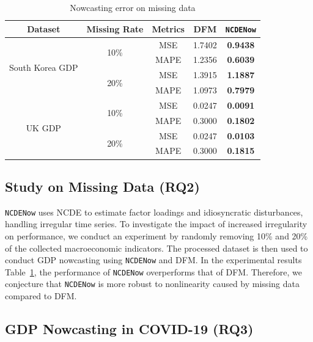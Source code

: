 \documentclass[sigconf]{acmart}
\begin{document}
\begin{table}[t]
\small
\centering
\caption{Nowcasting error on missing data}
\label{tab:exp_missing}
\begin{tabular}{ccccc}\toprule
Dataset & Missing Rate & Metrics & DFM & \texttt{NCDENow} \\\midrule
 \multirow{4}{*}{South Korea GDP}  
  & \multirow{2}{*}{10\%} 
  & MSE & 1.7402 & \textbf{0.9438} \\
 && MAPE & 1.2356 & \textbf{0.6039} \\\cmidrule(lr){2-5} 
  & \multirow{2}{*}{20\%} 
  & MSE & 1.3915 & \textbf{1.1887} \\
 && MAPE & 1.0973 & \textbf{0.7979} \\\midrule
 \multirow{4}{*}{UK GDP}
 & \multirow{2}{*}{10\%}
  & MSE & 0.0247 & \textbf{0.0091} \\
 && MAPE    & 0.3000 & \textbf{0.1802} \\\cmidrule(lr){2-5}
 & \multirow{2}{*}{20\%}
 & MSE & 0.0247 & \textbf{0.0103} \\
 && MAPE & 0.3000 & \textbf{0.1815} \\\bottomrule
\end{tabular}
\end{table}


\subsection{Study on Missing Data (RQ2)}\label{subsec:rq2}

\texttt{NCDENow} uses NCDE to estimate factor loadings and idiosyncratic disturbances, handling irregular time series. 
To investigate the impact of increased irregularity on performance, we conduct an experiment by randomly removing 10\% and 20\% of the collected macroeconomic indicators.
The processed dataset is then used to conduct GDP nowcasting using \texttt{NCDENow} and DFM.
In the experimental results Table~\ref{tab:exp_missing}, the performance of \texttt{NCDENow} overperforms that of DFM. Therefore, we conjecture that \texttt{NCDENow} is more robust to nonlinearity caused by missing data compared to DFM.

\subsection{GDP Nowcasting in COVID-19 (RQ3)}\label{subsec:rq3}
\end{document}
